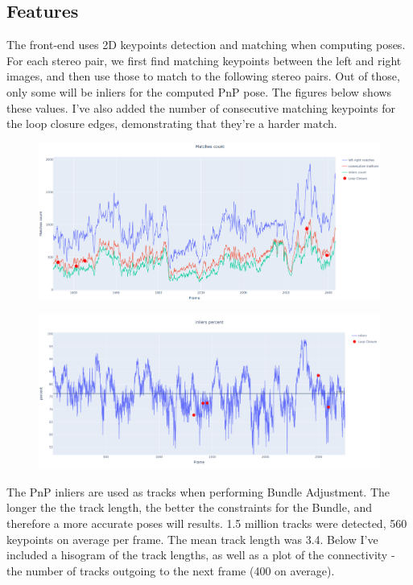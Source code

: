 \documentclass[12pt]{article}
\begin{document}
\newpage
\subsection{Features}
The front-end uses 2D keypoints detection and matching when computing poses. 
For each stereo pair, we first find matching keypoints between the left and right images, and then use those to match to the following stereo pairs. Out of those, only some will be inliers for the computed PnP pose. The figures below shows these values. I've also added the number of consecutive matching keypoints for the loop closure edges, demonstrating that they're a harder match. 
\begin{figure}[H]
\includegraphics[width=\textwidth]{matches count}
\end{figure}

\begin{figure}[H]
\includegraphics[width=\textwidth]{inliers percent}
\end{figure}
The PnP inliers are used as tracks when performing Bundle Adjustment. The longer the the track length, the better the constraints for the Bundle, and therefore a more accurate poses will results. 1.5 million tracks were detected, 560 keypoints on average per frame. The mean track length was 3.4. Below I've included a hisogram of the track lengths, as well as a plot of the connectivity - the number of tracks outgoing to the next frame (400 on average).
\end{document}

